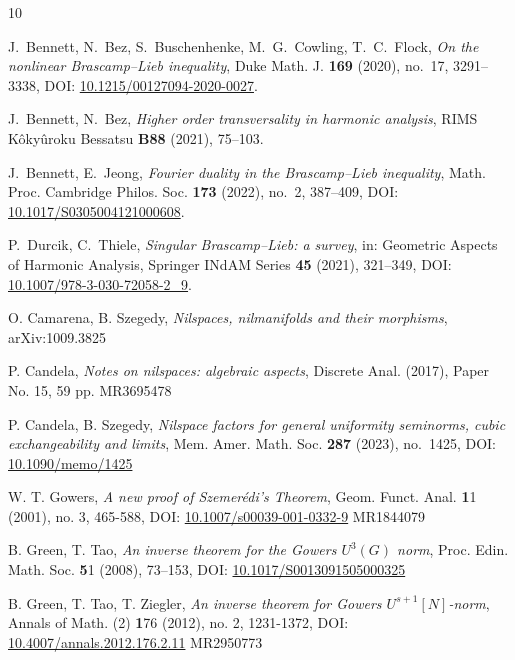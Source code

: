 \documentclass{amsart}
\theoremstyle{definition}
\theoremstyle{remark}
\numberwithin{equation}{section}
\begin{document}

\begin{thebibliography}{10}




J.~Bennett, N.~Bez, S.~Buschenhenke, M.~G.~Cowling, T.~C.~Flock, 
\textit{On the nonlinear Brascamp--Lieb inequality}, 
Duke Math. J. \textbf{169} (2020), no.~17, 3291--3338, \newline
DOI: \href{https://doi.org/10.1215/00127094-2020-0027}{10.1215/00127094-2020-0027}.

J.~Bennett, N.~Bez, 
\textit{Higher order transversality in harmonic analysis}, 
RIMS Kôkyûroku Bessatsu \textbf{B88} (2021), 75--103.

J.~Bennett, E.~Jeong, 
\textit{Fourier duality in the Brascamp--Lieb inequality}, 
Math. Proc. Cambridge Philos. Soc. \textbf{173} (2022), no.~2, 387--409, 
DOI: \href{https://doi.org/10.1017/S0305004121000608}{10.1017/S0305004121000608}.


P.~Durcik, C.~Thiele, 
\textit{Singular Brascamp--Lieb: a survey}, 
in: Geometric Aspects of Harmonic Analysis, Springer INdAM Series \textbf{45} (2021), 321--349, 
DOI: \href{https://doi.org/10.1007/978-3-030-72058-2_9}{10.1007/978-3-030-72058-2\_9}.

 O. Camarena, B. Szegedy, \textit{Nilspaces, nilmanifolds and their morphisms}, arXiv:1009.3825


 P. Candela, \textit{Notes on nilspaces: algebraic aspects}, Discrete Anal. (2017), Paper No. 15, 59 pp. MR3695478 

 P. Candela, B. Szegedy, \textit{Nilspace factors for general uniformity seminorms, cubic exchangeability and limits}, Mem. Amer. Math. Soc. \textbf{287} (2023), no.~1425, DOI: \href{https://doi.org/10.1090/memo/1425}{10.1090/memo/1425}

 W. T. Gowers, \textit{A new proof of Szemer\'edi's Theorem}, Geom. Funct. Anal. {\textbf 11} (2001), no. 3, 465-588, DOI: \href{https://doi.org/10.1007/s00039-001-0332-9}{10.1007/s00039-001-0332-9} MR1844079 

  B. Green, T. Tao, \textit{An inverse theorem for the Gowers $U^3(G)$ norm}, Proc. Edin. Math. Soc. {\textbf 51} (2008), 73–153, DOI: \href{https://doi.org/10.1017/S0013091505000325}{10.1017/S0013091505000325}


 B. Green, T. Tao, T. Ziegler, \textit{An inverse theorem for Gowers $U^{s+1}[N]$-norm}, Annals of Math. (2) {\textbf 176} (2012), no. 2, 1231-1372, DOI: \href{https://doi.org/10.4007/annals.2012.176.2.11}{10.4007/annals.2012.176.2.11} MR2950773 


\end{thebibliography}
\end{document}
